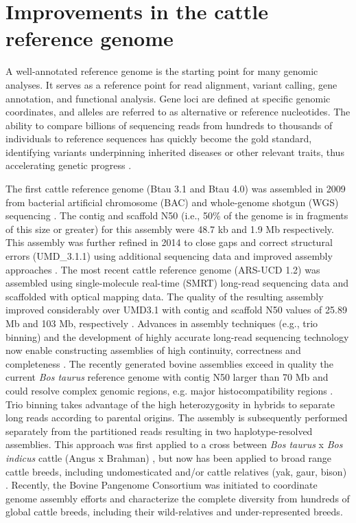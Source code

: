 \documentclass[../main.tex]{subfiles}
\begin{document}
\section{Improvements in the cattle reference genome} 

A well-annotated reference genome is the starting point for many genomic analyses. It serves as a reference point for read alignment, variant calling, gene annotation, and functional analysis. Gene loci are defined at specific genomic coordinates, and alleles are referred to as alternative or reference  nucleotides. The ability to compare billions of sequencing reads from hundreds to thousands of individuals to reference sequences has quickly become the gold standard, identifying variants underpinning  inherited diseases or other relevant traits, thus accelerating genetic progress \citep{bickhart2020symposium}.

The first cattle reference genome (Btau 3.1 and Btau 4.0) was assembled in 2009 from bacterial artificial chromosome (BAC) and whole-genome shotgun (WGS) sequencing \citep{elsik2009genome}. The contig and scaffold N50 (i.e., 50\% of the genome is in fragments of this size or greater) for this assembly were 48.7 kb and 1.9 Mb respectively. This assembly was further refined in 2014 to close gaps and correct structural errors (UMD\_3.1.1) using additional sequencing data and improved assembly approaches \citep{zimin2009whole}. The most recent cattle reference genome (ARS-UCD 1.2) was assembled using single-molecule real-time (SMRT) long-read sequencing data and scaffolded with optical mapping data. The quality of the resulting assembly improved considerably over UMD3.1 with contig and scaffold N50 values of 25.89 Mb and 103 Mb, respectively \citep{rosen2020novo}. Advances in assembly techniques (e.g., trio binning) and the development of highly accurate long-read sequencing technology now enable constructing assemblies of high continuity, correctness and completeness \citep{bickhart2020symposium}. The recently generated bovine assemblies exceed in quality the current \emph{Bos taurus} reference genome with contig N50 larger than 70 Mb and could resolve complex genomic regions, e.g. major histocompatibility regions \citep{rice2020continuous}. Trio binning takes advantage of the high heterozygosity in hybrids to separate long reads according to parental origins. The assembly is subsequently performed separately from the partitioned reads resulting in two haplotype-resolved assemblies. This approach  was first applied  to a cross between \emph{Bos taurus} x \emph{Bos indicus} cattle (Angus x Brahman) \citep{koren2018novo}, but now has been applied to broad range cattle breeds, including  undomesticated and/or cattle relatives (yak, gaur, bison) \citep{oppenheimer2021reference}. Recently, the Bovine Pangenome Consortium \citep{heaton2021reference} was initiated to coordinate genome assembly efforts and characterize the complete diversity from hundreds of global cattle breeds, including their wild-relatives and under-represented breeds. 
\end{document}
